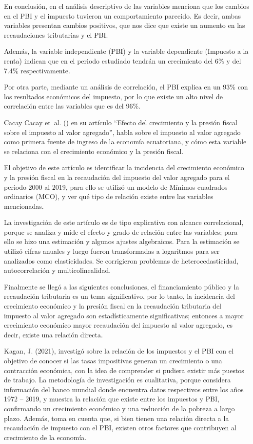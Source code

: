 \documentclass[
  jou,
  floatsintext,
  longtable,
  a4paper,
  nolmodern,
  notxfonts,
  notimes,
  12pt,
  colorlinks=true,linkcolor=blue,citecolor=blue,urlcolor=blue]{apa7}
\begin{document}
En conclusión, en el análisis descriptivo de las variables menciona que
los cambios en el PBI y el impuesto tuvieron un comportamiento parecido.
Es decir, ambas variables presentan cambios positivos, que nos dice que
existe un aumento en las recaudaciones tributarias y el PBI.

Además, la variable independiente (PBI) y la variable dependiente
(Impuesto a la renta) indican que en el periodo estudiado tendrán un
crecimiento del 6\% y del 7.4\% respectivamente.

Por otra parte, mediante un análisis de correlación, el PBI explica en
un 93\% con los resultados económicos del impuesto, por lo que existe un
alto nivel de correlación entre las variables que es del 96\%.

Cacay Cacay et~al. () en su
artículo ``Efecto del crecimiento y la presión fiscal sobre el impuesto
al valor agregado'', habla sobre el impuesto al valor agregado como
primera fuente de ingreso de la economía ecuatoriana, y cómo esta
variable se relaciona con el crecimiento económico y la presión fiscal.

El objetivo de este artículo es identificar la incidencia del
crecimiento económico y la presión fiscal en la recaudación del impuesto
del valor agregado para el periodo 2000 al 2019, para ello se utilizó un
modelo de Mínimos cuadrados ordinarios (MCO), y ver qué tipo de relación
existe entre las variables mencionadas.

La investigación de este artículo es de tipo explicativa con alcance
correlacional, porque se analiza y mide el efecto y grado de relación
entre las variables; para ello se hizo una estimación y algunos ajustes
algebraicos. Para la estimación se utilizó cifras anuales y luego fueron
transformadas a logaritmos para ser analizados como elasticidades. Se
corrigieron problemas de heterocedasticidad, autocorrelación y
multicolinealidad.

Finalmente se llegó a las siguientes conclusiones, el financiamiento
público y la recaudación tributaria es un tema significativo, por lo
tanto, la incidencia del crecimiento económico y la presión fiscal en la
recaudación tributaria del impuesto al valor agregado son
estadísticamente significativas; entonces a mayor crecimiento económico
mayor recaudación del impuesto al valor agregado, es decir, existe una
relación directa.

Kagan, J. (2021), investigó sobre la relación de los impuestos y el PBI
con el objetivo de conocer si las tasas impositivas generan un
crecimiento o una contracción económica, con la idea de comprender si
pudiera existir más puestos de trabajo. La metodología de investigación
es cualitativa, porque considera información del banco mundial donde
encuentra datos respectivos entre los años 1972 -- 2019, y muestra la
relación que existe entre los impuestos y PBI, confirmando un
crecimiento económico y una reducción de la pobreza a largo plazo.
Además, toma en cuenta que, si bien tienen una relación directa a la
recaudación de impuesto con el PBI, existen otros factores que
contribuyen al crecimiento de la economía.
\end{document}
